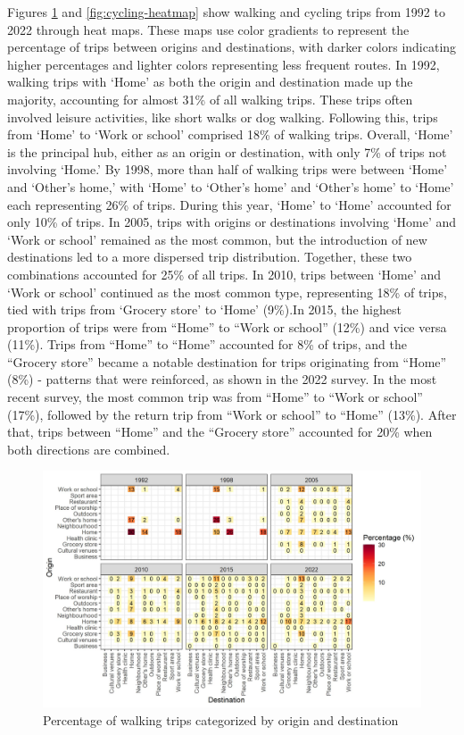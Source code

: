 \documentclass[preprint, 3p,
authoryear]{elsarticle} %
\begin{document}
Figures \ref{fig:walking-heatmap} and \ref{fig:cycling-heatmap} show
walking and cycling trips from 1992 to 2022 through heat maps. These
maps use color gradients to represent the percentage of trips between
origins and destinations, with darker colors indicating higher
percentages and lighter colors representing less frequent routes. In
1992, walking trips with `Home' as both the origin and destination made
up the majority, accounting for almost 31\% of all walking trips. These
trips often involved leisure activities, like short walks or dog
walking. Following this, trips from `Home' to `Work or school' comprised
18\% of walking trips. Overall, `Home' is the principal hub, either as
an origin or destination, with only 7\% of trips not involving `Home.'
By 1998, more than half of walking trips were between `Home' and
`Other's home,' with `Home' to `Other's home' and `Other's home' to
`Home' each representing 26\% of trips. During this year, `Home' to
`Home' accounted for only 10\% of trips. In 2005, trips with origins or
destinations involving `Home' and `Work or school' remained as the most
common, but the introduction of new destinations led to a more dispersed
trip distribution. Together, these two combinations accounted for 25\%
of all trips. In 2010, trips between `Home' and `Work or school'
continued as the most common type, representing 18\% of trips, tied with
trips from `Grocery store' to `Home' (9\%).In 2015, the highest
proportion of trips were from ``Home'' to ``Work or school'' (12\%) and
vice versa (11\%). Trips from ``Home'' to ``Home'' accounted for 8\% of
trips, and the ``Grocery store'' became a notable destination for trips
originating from ``Home'' (8\%) - patterns that were reinforced, as
shown in the 2022 survey. In the most recent survey, the most common
trip was from ``Home'' to ``Work or school'' (17\%), followed by the
return trip from ``Work or school'' to ``Home'' (13\%). After that,
trips between ``Home'' and the ``Grocery store'' accounted for 20\% when
both directions are combined.

\begin{figure}
\includegraphics[width=1\linewidth]{figures/walking_hm_fig} \caption{Percentage of walking trips categorized by origin and destination}\label{fig:walking-heatmap}
\end{figure}
\end{document}

